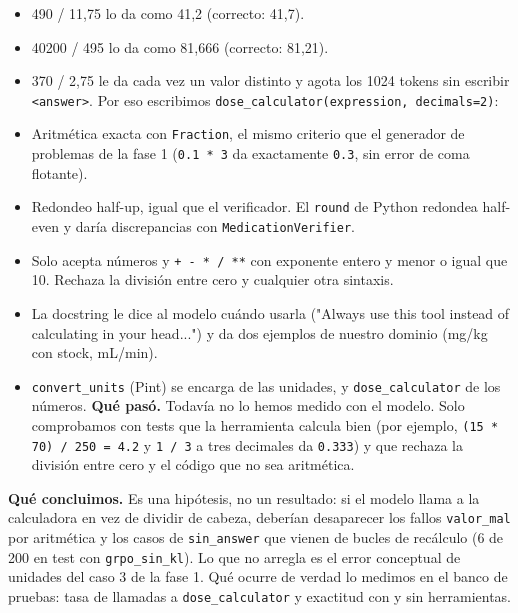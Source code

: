 \begin{itemize}
\item
  490 / 11,75 lo da como 41,2 (correcto: 41,7).
\item
  40200 / 495 lo da como 81,666 (correcto: 81,21).
\item
  370 / 2,75 le da cada vez un valor distinto y agota los 1024 tokens sin escribir \texttt{\textless{}answer\textgreater{}}.
  Por eso escribimos \texttt{dose\_\allowbreak{}calculator(expression, decimals=\allowbreak{}2)}:
\item
  Aritmética exacta con \texttt{Fraction}, el mismo criterio que el generador de problemas de la fase 1
  (\texttt{0.1 * 3} da exactamente \texttt{0.3}, sin error de coma flotante).
\item
  Redondeo half-up, igual que el verificador. El \texttt{round} de Python redondea half-even y daría
  discrepancias con \texttt{MedicationVerifier}.
\item
  Solo acepta números y \texttt{+ - * /\allowbreak{} **} con exponente entero y menor o igual que 10. Rechaza la
  división entre cero y cualquier otra sintaxis.
\item
  La docstring le dice al modelo cuándo usarla ("Always use this tool instead of calculating in
  your head...") y da dos ejemplos de nuestro dominio (mg/kg con stock, mL/min).
\item
  \texttt{convert\_\allowbreak{}units} (Pint) se encarga de las unidades, y \texttt{dose\_\allowbreak{}calculator} de los números.
  \textbf{Qué pasó.} Todavía no lo hemos medido con el modelo. Solo comprobamos con tests que la
  herramienta calcula bien (por ejemplo, \texttt{(15 * 70) /\allowbreak{} 250 =\allowbreak{} 4.2} y \texttt{1 /\allowbreak{} 3} a tres decimales da
  \texttt{0.333}) y que rechaza la división entre cero y el código que no sea aritmética.
\end{itemize}

\textbf{Qué concluimos.} Es una hipótesis, no un resultado: si el modelo llama a la calculadora en
vez de dividir de cabeza, deberían desaparecer los fallos \texttt{valor\_\allowbreak{}mal} por aritmética y los casos
de \texttt{sin\_\allowbreak{}answer} que vienen de bucles de recálculo (6 de 200 en test con \texttt{grpo\_\allowbreak{}sin\_\allowbreak{}kl}). Lo que no
arregla es el error conceptual de unidades del caso 3 de la fase 1. Qué ocurre de verdad lo
medimos en el banco de pruebas: tasa de llamadas a \texttt{dose\_\allowbreak{}calculator} y exactitud con y sin
herramientas.

